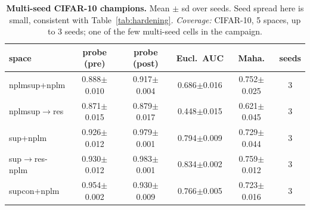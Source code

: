 \begin{table}[t]
\centering
\small
\begin{tabular}{lccccc}
\toprule
space & probe (pre) & probe (post) & Eucl.\ AUC & Maha. & seeds \\
\midrule
nplmsup+nplm & 0.888$\pm$0.010 & 0.917$\pm$0.004 & 0.686$\pm$0.016 & 0.752$\pm$0.025 & 3 \\
nplmsup$\to$res & 0.871$\pm$0.015 & 0.879$\pm$0.017 & 0.448$\pm$0.015 & 0.621$\pm$0.045 & 3 \\
sup+nplm & 0.926$\pm$0.012 & 0.979$\pm$0.001 & 0.794$\pm$0.009 & 0.729$\pm$0.044 & 3 \\
sup$\to$res-nplm & 0.930$\pm$0.012 & 0.983$\pm$0.001 & 0.834$\pm$0.002 & 0.759$\pm$0.012 & 3 \\
supcon+nplm & 0.954$\pm$0.002 & 0.930$\pm$0.009 & 0.766$\pm$0.005 & 0.723$\pm$0.016 & 3 \\
\bottomrule
\end{tabular}
\caption{\textbf{Multi-seed CIFAR-10 champions.} Mean $\pm$ sd over seeds. Seed spread here is small, consistent with Table~\ref{tab:hardening}. \emph{Coverage:} CIFAR-10, 5 spaces, up to 3 seeds; one of the few multi-seed cells in the campaign.}
\label{tab:seeds}
\end{table}
